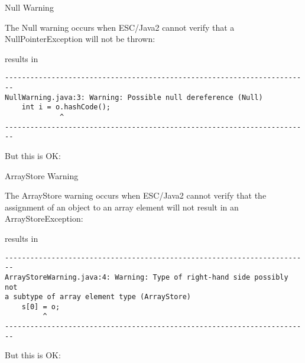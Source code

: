 \documentclass[
pdf,
nocolorBG,
slideColor,
cok,
]{prosper}
\begin{document}
\begin{slide}{Null Warning}
\vspace*{-9ex}

The Null warning occurs when ESC/Java2 cannot verify that a NullPointerException will not be thrown:
{\tiny
\begin{figure*}

\end{figure*}
}
results in
{\tiny
\begin{verbatim}
------------------------------------------------------------------------
NullWarning.java:3: Warning: Possible null dereference (Null)
    int i = o.hashCode();
             ^
------------------------------------------------------------------------
\end{verbatim}
}

But this is OK:
{\tiny
\begin{figure*}

\end{figure*}
}


\end{slide}
\begin{slide}{ArrayStore Warning}
\tiny

\vspace*{-12ex}

The ArrayStore warning occurs when ESC/Java2 cannot verify that the assignment of an object 
to an array element will not result in an ArrayStoreException:
\vspace*{-1ex}
{\tiny
\begin{figure*}

\end{figure*}
}
\vspace*{-2ex}
results in
\vspace*{-1ex}
{\tiny
\begin{verbatim}
------------------------------------------------------------------------
ArrayStoreWarning.java:4: Warning: Type of right-hand side possibly not 
a subtype of array element type (ArrayStore)
    s[0] = o;
         ^
------------------------------------------------------------------------
\end{verbatim}
}
\vspace*{-1ex}
But this is OK:
\vspace*{-1ex}
{\tiny
\begin{figure*}

\end{figure*}
}
\end{slide}
\end{document}
